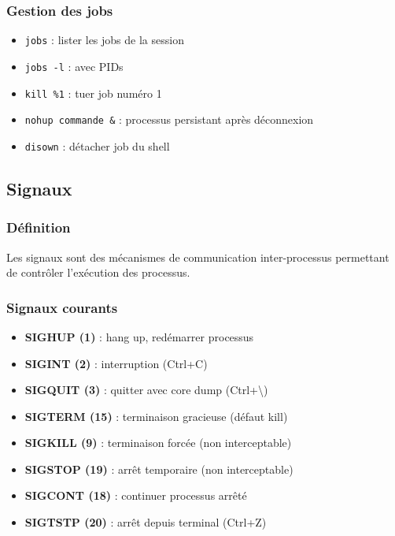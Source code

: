 \documentclass[12pt,a4paper]{article}
\begin{document}
\subsubsection{Gestion des jobs}
\begin{itemize}
    \item \texttt{jobs} : lister les jobs de la session %
    \item \texttt{jobs -l} : avec PIDs %
    \item \texttt{kill \%1} : tuer job num\'ero 1 %
    \item \texttt{nohup commande \&} : processus persistant apr\`es d\'econnexion %
    \item \texttt{disown} : d\'etacher job du shell %
\end{itemize}


\subsection{Signaux}

\subsubsection{D\'efinition}
Les signaux sont des m\'ecanismes de communication inter-processus permettant de contr\^oler l'ex\'ecution des processus.

\subsubsection{Signaux courants}
\begin{itemize}
    \item \textbf{SIGHUP (1)} : hang up, red\'emarrer processus %
    \item \textbf{SIGINT (2)} : interruption (Ctrl+C) %
    \item \textbf{SIGQUIT (3)} : quitter avec core dump (Ctrl+\textbackslash) %
    \item \textbf{SIGTERM (15)} : terminaison gracieuse (d\'efaut kill) %
    \item \textbf{SIGKILL (9)} : terminaison forc\'ee (non interceptable) %
    \item \textbf{SIGSTOP (19)} : arr\^et temporaire (non interceptable) %
    \item \textbf{SIGCONT (18)} : continuer processus arr\^et\'e %
    \item \textbf{SIGTSTP (20)} : arr\^et depuis terminal (Ctrl+Z) %
\end{itemize}
\end{document}
